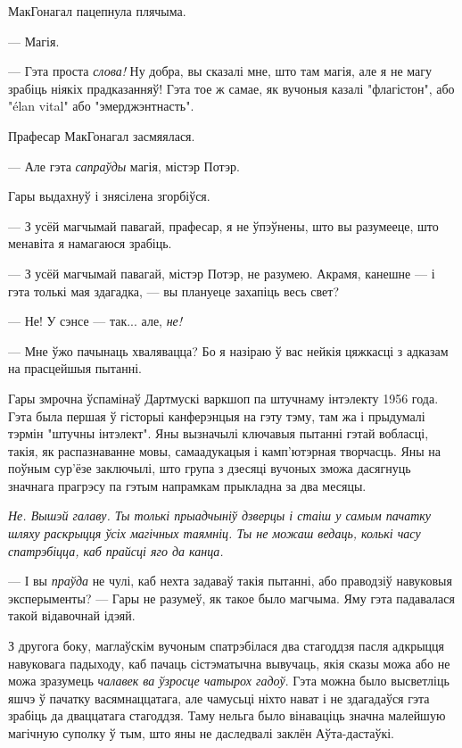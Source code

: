 МакГонагал пацепнула плячыма.

--- Магія.

--- Гэта проста \emph{слова!} Ну добра, вы сказалі мне, што там магія, але я не
магу зрабіць ніякіх прадказанняў! Гэта тое ж самае, як вучоныя казалі "флагістон",
або "élan vital" або "эмерджэнтнасть". %

Прафесар МакГонагал засмяялася.

--- Але гэта \emph{сапраўды} магія, містэр Потэр.

Гары выдахнуў і знясілена згорбіўся.

--- З усёй магчымай павагай, прафесар, я не ўпэўнены, што вы разумееце, што менавіта я
намагаюся зрабіць.

--- З усёй магчымай павагай, містэр Потэр, не разумею. Акрамя, канешне --- і
гэта толькі мая здагадка, --- вы плануеце захапіць весь свет?

--- Не! У сэнсе --- так... але, \emph{не!}

--- Мне ўжо пачынаць хвалявацца? Бо я назіраю ў вас нейкія цяжкасці з адказам на
прасцейшыя пытанні.

Гары змрочна ўспамінаў Дартмускі варкшоп па штучнаму інтэлекту 1956 года. Гэта
была першая ў гісторыі канферэнцыя на гэту тэму, там жа і прыдумалі тэрмін 
"штучны інтэлект". Яны вызначылі ключавыя пытанні гэтай вобласці, такія, як
распазнаванне мовы, самаадукацыя і камп'ютэрная творчасць.
Яны на поўным сур'ёзе заключылі, што група з дзесяці вучоных зможа дасягнуць
значнага прагрэсу па гэтым напрамкам прыкладна за два месяцы.

\emph{Не. Вышэй галаву. Ты толькі прыадчыніў дзверцы і стаіш у самым пачатку шляху
раскрыцця ўсіх магічных таямніц. Ты не можаш ведаць, колькі часу спатрэбіцца, каб
прайсці яго да канца.}

--- І вы \emph{праўда} не чулі, каб нехта задаваў такія пытанні, або праводзіў 
навуковыя эксперыменты? --- Гары не разумеў, як такое было магчыма. Яму гэта падавалася
такой відавочнай ідэяй.

З другога боку, маглаўскім вучоным спатрэбілася два стагоддзя пасля адкрыцця
навуковага падыходу, каб пачаць сістэматычна вывучаць, якія сказы 
можа або не можа зразумець \emph{чалавек ва ўзросце чатырох гадоў}. Гэта можна
было высветліць яшчэ ў пачатку васямнаццатага, але чамусьці ніхто нават і не 
здагадаўся гэта зрабіць да дваццатага стагоддзя. Таму нельга было вінаваціць 
значна малейшую магічную суполку ў тым, што яны не даследвалі заклён Аўта-дастаўкі.

